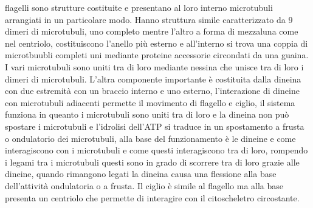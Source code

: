 flagelli sono strutture costituite e presentano al loro interno microtubuli arrangiati in un particolare modo. Hanno struttura simile caratterizzato da 9 dimeri di microtubuli, uno 
completo mentre l'altro a forma di mezzaluna come nel centriolo, costituiscono l'anello pi\`u esterno e all'interno si trova una coppia di microtbuubli completi uni mediante proteine
accessorie circondati da una guaina. I vari microtubuli sono uniti tra di loro mediante nessina che unisce tra di loro i dimeri di microtubuli. L'altra componente importante \`e
costituita dalla dineina con due estremit\`a con un braccio interno e uno esterno, l'interazione di dineine con microtubuli adiacenti permette il movimento di flagello e ciglio, il 
sistema funziona in queanto i microtubuli sono uniti tra di loro e la dineina non pu\`o spostare i microtubuli e l'idrolisi dell'ATP si traduce in un spostamento a frusta o ondulatorio 
dei microtubuli, alla base del funzionamento \`e le dineine e come interagiscono con i microtubuli e come questi interagiscono tra di loro, rompendo i legami tra i microtubuli questi 
sono in grado di scorrere tra di loro grazie alle dineine, quando rimangono legati la dineina causa una flessione alla base dell'attivit\`a ondulatoria o a frusta. Il ciglio \`e simile 
al flagello ma alla base presenta un centriolo che permette di interagire con il citoscheletro circostante. 
